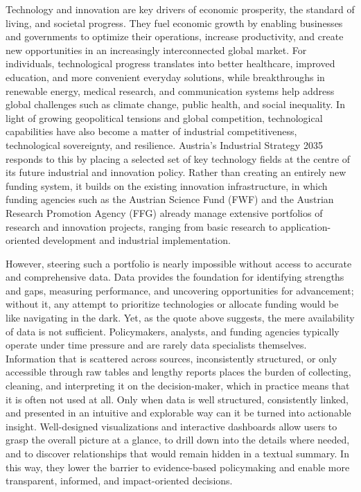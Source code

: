 Technology and innovation are key drivers of economic prosperity, the standard of living, and societal progress.
They fuel economic growth by enabling businesses and governments to optimize their operations, increase productivity,
and create new opportunities in an increasingly interconnected global market.
For individuals, technological progress translates into better healthcare, improved education, and more convenient
everyday solutions, while breakthroughs in renewable energy, medical research, and communication systems help address
global challenges such as climate change, public health, and social inequality.
In light of growing geopolitical tensions and global competition, technological capabilities have also become a matter of
industrial competitiveness, technological sovereignty, and resilience.
Austria's Industrial Strategy 2035  responds to this by placing a selected set of key technology fields at
the centre of its future industrial and innovation policy.
Rather than creating an entirely new funding system, it builds on the existing innovation infrastructure, in which
funding agencies such as the Austrian Science Fund (FWF) and the Austrian Research Promotion Agency (FFG)
 already manage extensive portfolios of research and innovation projects, ranging from basic research
to application-oriented development and industrial implementation.

However, steering such a portfolio is nearly impossible without access to accurate and comprehensive data.
Data provides the foundation for identifying strengths and gaps, measuring performance, and uncovering opportunities for
advancement; without it, any attempt to prioritize technologies or allocate funding would be like navigating in the dark.
Yet, as the quote above suggests, the mere availability of data is not sufficient.
Policymakers, analysts, and funding agencies typically operate under time pressure and are rarely data specialists
themselves.
Information that is scattered across sources, inconsistently structured, or only accessible through raw tables and
lengthy reports places the burden of collecting, cleaning, and interpreting it on the decision-maker, which in practice
means that it is often not used at all.
Only when data is well structured, consistently linked, and presented in an intuitive and explorable way can it be
turned into actionable insight.
Well-designed visualizations and interactive dashboards allow users to grasp the overall picture at a glance, to drill
down into the details where needed, and to discover relationships that would remain hidden in a textual summary.
In this way, they lower the barrier to evidence-based policymaking and enable more transparent, informed, and
impact-oriented decisions.

